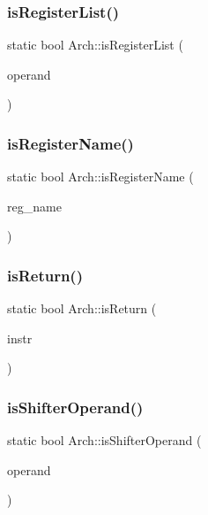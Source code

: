 \subsubsection{\texorpdfstring{is\+Register\+List()}{isRegisterList()}}
{\footnotesize\ttfamily static bool Arch\+::is\+Register\+List (\begin{DoxyParamCaption}\item[{const string \&}]{operand }\end{DoxyParamCaption})\hspace{0.3cm}{\ttfamily [static]}}

\mbox{\label{classArch_a23765c24091362fb1e974fba027cdfb1}} 
\subsubsection{\texorpdfstring{is\+Register\+Name()}{isRegisterName()}}
{\footnotesize\ttfamily static bool Arch\+::is\+Register\+Name (\begin{DoxyParamCaption}\item[{const string \&}]{reg\+\_\+name }\end{DoxyParamCaption})\hspace{0.3cm}{\ttfamily [static]}}

\mbox{\label{classArch_ad7b08b24c7d2e633ccb773fe9bd22489}} 
\subsubsection{\texorpdfstring{is\+Return()}{isReturn()}}
{\footnotesize\ttfamily static bool Arch\+::is\+Return (\begin{DoxyParamCaption}\item[{const \hyperlink{classObjdumpInstruction}{Objdump\+Instruction} \&}]{instr }\end{DoxyParamCaption})\hspace{0.3cm}{\ttfamily [static]}}

\mbox{\label{classArch_ac5b9875dc1b688701498bbf6cde5d787}} 
\subsubsection{\texorpdfstring{is\+Shifter\+Operand()}{isShifterOperand()}}
{\footnotesize\ttfamily static bool Arch\+::is\+Shifter\+Operand (\begin{DoxyParamCaption}\item[{const string \&}]{operand }\end{DoxyParamCaption})\hspace{0.3cm}{\ttfamily [static]}}

